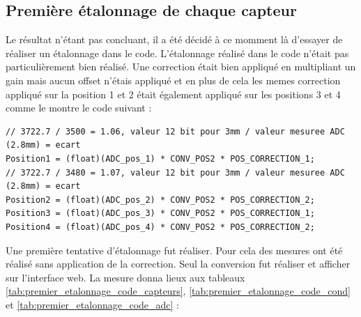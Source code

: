 \subsection{Première étalonnage de chaque capteur}
Le résultat n'étant pas concluant, il a été décidé à ce momment là d'essayer de réaliser un étalonnage dans le code. L'étalonnage réalisé dans le code n'était pas particulièrement bien réalisé. Une correction était bien appliqué en multipliant un gain mais aucun offset n'étais appliqué et en plus de cela les memes correction appliqué sur la position 1 et 2 était également appliqué sur les positions 3 et 4 comme le montre le code suivant :

\begin{verbatim}
// 3722.7 / 3500 = 1.06, valeur 12 bit pour 3mm / valeur mesuree ADC (2.8mm) = ecart
Position1 = (float)(ADC_pos_1) * CONV_POS2 * POS_CORRECTION_1;
// 3722.7 / 3480 = 1.07, valeur 12 bit pour 3mm / valeur mesuree ADC (2.8mm) = ecart
Position2 = (float)(ADC_pos_2) * CONV_POS2 * POS_CORRECTION_2;
Position3 = (float)(ADC_pos_3) * CONV_POS2 * POS_CORRECTION_1;
Position4 = (float)(ADC_pos_4) * CONV_POS2 * POS_CORRECTION_2;
\end{verbatim}

Une première tentative d'étalonnage fut réaliser. Pour cela des mesures ont été réalisé sans application de la correction. Seul la conversion fut réaliser et afficher sur l'interface web. La mesure donna lieux aux tableaux \ref{tab:premier_etalonnage_code_capteurs}, \ref{tab:premier_etalonnage_code_cond} et \ref{tab:premier_etalonnage_code_adc} :


